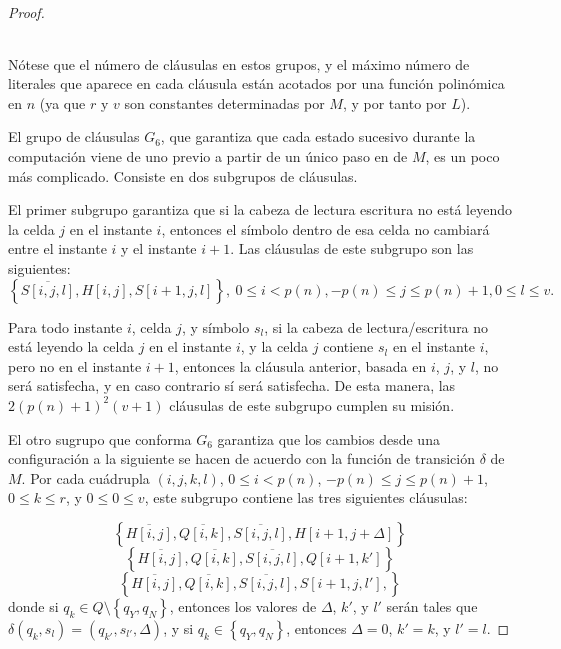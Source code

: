 \documentclass[11pt, a4paper]{memoir}
\begin{document}
\begin{proof}
\begin{table}[!ht]
\begin{center}
{\begin{tabular}{@{}C{.20\textwidth}L{.75\textwidth}@{}}
\begin{minipage}{.70\textwidth}
  \end{minipage}  \\        
\bottomrule
			\end{tabular}
		}
	\end{center}
\end{table}

Nótese que el número de cláusulas en estos grupos, y el máximo número de literales que aparece en cada cláusula están acotados por una función polinómica en $n$ (ya que $r$ y $v$ son constantes determinadas por $M$, y por tanto por $L$).

El grupo de cláusulas $G_6$, que garantiza que cada estado sucesivo durante la computación viene de uno previo a partir de un único paso en de $M$, es un poco más complicado. Consiste en dos subgrupos de cláusulas.

El primer subgrupo garantiza que si la cabeza de lectura escritura no está leyendo la celda $j$ en el instante $i$, entonces el símbolo dentro de esa celda no cambiará entre el instante $i$ y el instante $i+1$. Las cláusulas de este subgrupo son las siguientes: 
\[
\left \{ \overline{S[i,j,l]}, H[i,j], S[i + 1, j, l] \right \}, ~ 0 \le i < p(n), -p(n) \le j \le p(n) + 1, 0 \le l \le v.
\]

Para todo instante $i$, celda $j$, y símbolo $s_l$, si la cabeza de lectura/escritura no está leyendo la celda $j$ en el instante $i$, y la celda $j$ contiene $s_l$ en el instante $i$, pero no en el instante $i + 1$, entonces la cláusula anterior, basada en $i$, $j$, y $l$, no será satisfecha, y en caso contrario sí será satisfecha. De esta manera, las $2(p(n) + 1)^2(v+ 1)$ cláusulas de este subgrupo cumplen su misión.

El otro sugrupo que conforma $G_6$ garantiza que los cambios desde una configuración a la siguiente se hacen de acuerdo con la función de transición $\delta$ de $M$. Por cada cuádrupla $(i, j, k, l)$, $0\le i < p(n)$, $-p(n) \le j \le p(n) + 1$, $0 \le k \le r$, y $0 \le 0 \le v$, este subgrupo contiene las tres siguientes cláusulas:  

\[
\left \{ \overline{H[i,j]}, \overline{Q[i,k]}, \overline{S[i, j, l]}, H[i + 1, j + \Delta] \right \}
\]
\[
\left \{ \overline{H[i,j]}, \overline{Q[i,k]}, \overline{S[i, j, l]}, Q[i + 1, k'] \right \}
\]
\[
\left \{ \overline{H[i,j]}, \overline{Q[i,k]}, \overline{S[i, j, l]}, S[i + 1, j, l'], \right \}
\]
donde si $q_k\in Q \setminus \left \{ q_Y, q_N \right \}$, entonces los valores de $\Delta$, $k'$, y $l'$ serán tales que $\delta(q_k, s_l) = \left ( q_{k'}, s_{l'}, \Delta \right )$, y si $q_k\in \left \{q_Y, q_N \right \}$, entonces $\Delta = 0$, $k' = k$, y $l' = l$.


\end{proof}
\end{document}
